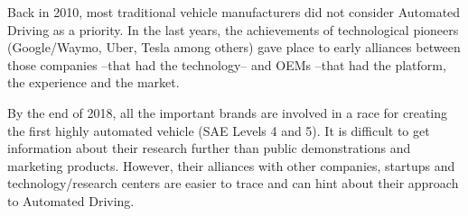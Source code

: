 Back in 2010, most traditional vehicle manufacturers did not consider Automated
Driving as a priority. In the last years, the achievements of technological 
pioneers (Google/Waymo, Uber, Tesla among others) gave place to early alliances
between those companies --that had the technology-- and OEMs --that had the
platform, the experience and the market.

By the end of 2018, all the important brands are involved in a race for creating
the first highly automated vehicle (SAE Levels 4 and 5). It is difficult to
get information about their research further than public demonstrations and
marketing products. However, their alliances with other companies, startups
and technology/research centers are easier to trace and can hint about their 
approach to Automated Driving.


